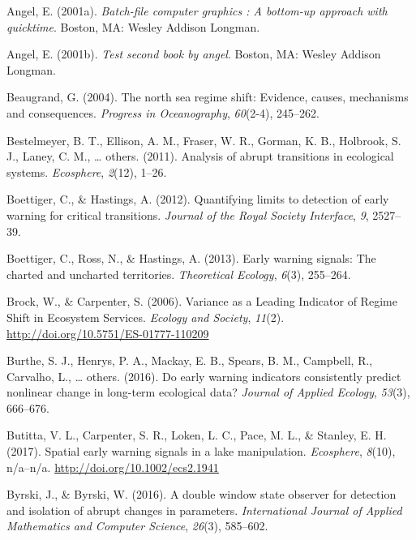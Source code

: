 \documentclass[12pt,twoside,openany]{reedthesis}
\begin{document}
\leavevmode\hypertarget{ref-angel2001}{}%
Angel, E. (2001a). \emph{Batch-file computer graphics : A bottom-up approach with quicktime}. Boston, MA: Wesley Addison Longman.

\leavevmode\hypertarget{ref-angel2002a}{}%
Angel, E. (2001b). \emph{Test second book by angel}. Boston, MA: Wesley Addison Longman.

\leavevmode\hypertarget{ref-beaugrand2004north}{}%
Beaugrand, G. (2004). The north sea regime shift: Evidence, causes, mechanisms and consequences. \emph{Progress in Oceanography}, \emph{60}(2-4), 245--262.

\leavevmode\hypertarget{ref-bestelmeyer_analysis_2011}{}%
Bestelmeyer, B. T., Ellison, A. M., Fraser, W. R., Gorman, K. B., Holbrook, S. J., Laney, C. M., \ldots{} others. (2011). Analysis of abrupt transitions in ecological systems. \emph{Ecosphere}, \emph{2}(12), 1--26.

\leavevmode\hypertarget{ref-boettiger_quantifying_2012}{}%
Boettiger, C., \& Hastings, A. (2012). Quantifying limits to detection of early warning for critical transitions. \emph{Journal of the Royal Society Interface}, \emph{9}, 2527--39.

\leavevmode\hypertarget{ref-boettiger_early_2013}{}%
Boettiger, C., Ross, N., \& Hastings, A. (2013). Early warning signals: The charted and uncharted territories. \emph{Theoretical Ecology}, \emph{6}(3), 255--264.

\leavevmode\hypertarget{ref-brock_variance_2006}{}%
Brock, W., \& Carpenter, S. (2006). Variance as a Leading Indicator of Regime Shift in Ecosystem Services. \emph{Ecology and Society}, \emph{11}(2). \url{http://doi.org/10.5751/ES-01777-110209}

\leavevmode\hypertarget{ref-burthe2016early}{}%
Burthe, S. J., Henrys, P. A., Mackay, E. B., Spears, B. M., Campbell, R., Carvalho, L., \ldots{} others. (2016). Do early warning indicators consistently predict nonlinear change in long-term ecological data? \emph{Journal of Applied Ecology}, \emph{53}(3), 666--676.

\leavevmode\hypertarget{ref-butitta_spatial_2017}{}%
Butitta, V. L., Carpenter, S. R., Loken, L. C., Pace, M. L., \& Stanley, E. H. (2017). Spatial early warning signals in a lake manipulation. \emph{Ecosphere}, \emph{8}(10), n/a--n/a. \url{http://doi.org/10.1002/ecs2.1941}

\leavevmode\hypertarget{ref-byrski2016double}{}%
Byrski, J., \& Byrski, W. (2016). A double window state observer for detection and isolation of abrupt changes in parameters. \emph{International Journal of Applied Mathematics and Computer Science}, \emph{26}(3), 585--602.
\end{document}
